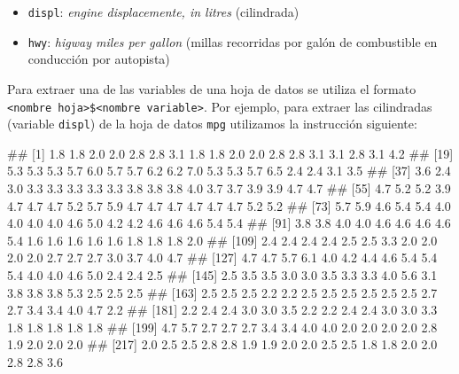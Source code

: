 \documentclass[
  title=normal,
  notoc,
  bib=normal]{mnye}
\newenvironment{Shaded}{\begin{snugshade}}{\end{snugshade}}
\newcommand{\NormalTok}[1]{#1}
\newcommand{\SpecialCharTok}[1]{\textcolor[rgb]{0.00,0.00,0.00}{#1}}
\providecommand{\tightlist}{%
  \setlength{\itemsep}{0pt}\setlength{\parskip}{0pt}}
\begin{document}
\begin{itemize}
\tightlist
\item
  \texttt{displ}: \emph{engine displacemente, in litres} (cilindrada)
\item
  \texttt{hwy}: \emph{higway miles per gallon} (millas recorridas por galón de combustible en conducción por autopista)
\end{itemize}

Para extraer una de las variables de una hoja de datos se utiliza el formato \texttt{\textless{}nombre\ hoja\textgreater{}\$\textless{}nombre\ variable\textgreater{}}. Por ejemplo, para extraer las cilindradas (variable \texttt{displ}) de la hoja de datos \texttt{mpg} utilizamos la instrucción siguiente:

\begin{Shaded}
\end{Shaded}

\begin{Shaded}
\begin{Highlighting}[]
\NormalTok{\#\#   [1] 1.8 1.8 2.0 2.0 2.8 2.8 3.1 1.8 1.8 2.0 2.0 2.8 2.8 3.1 3.1 2.8 3.1 4.2}
\NormalTok{\#\#  [19] 5.3 5.3 5.3 5.7 6.0 5.7 5.7 6.2 6.2 7.0 5.3 5.3 5.7 6.5 2.4 2.4 3.1 3.5}
\NormalTok{\#\#  [37] 3.6 2.4 3.0 3.3 3.3 3.3 3.3 3.3 3.8 3.8 3.8 4.0 3.7 3.7 3.9 3.9 4.7 4.7}
\NormalTok{\#\#  [55] 4.7 5.2 5.2 3.9 4.7 4.7 4.7 5.2 5.7 5.9 4.7 4.7 4.7 4.7 4.7 4.7 5.2 5.2}
\NormalTok{\#\#  [73] 5.7 5.9 4.6 5.4 5.4 4.0 4.0 4.0 4.0 4.6 5.0 4.2 4.2 4.6 4.6 4.6 5.4 5.4}
\NormalTok{\#\#  [91] 3.8 3.8 4.0 4.0 4.6 4.6 4.6 4.6 5.4 1.6 1.6 1.6 1.6 1.6 1.8 1.8 1.8 2.0}
\NormalTok{\#\# [109] 2.4 2.4 2.4 2.4 2.5 2.5 3.3 2.0 2.0 2.0 2.0 2.7 2.7 2.7 3.0 3.7 4.0 4.7}
\NormalTok{\#\# [127] 4.7 4.7 5.7 6.1 4.0 4.2 4.4 4.6 5.4 5.4 5.4 4.0 4.0 4.6 5.0 2.4 2.4 2.5}
\NormalTok{\#\# [145] 2.5 3.5 3.5 3.0 3.0 3.5 3.3 3.3 4.0 5.6 3.1 3.8 3.8 3.8 5.3 2.5 2.5 2.5}
\NormalTok{\#\# [163] 2.5 2.5 2.5 2.2 2.2 2.5 2.5 2.5 2.5 2.5 2.5 2.7 2.7 3.4 3.4 4.0 4.7 2.2}
\NormalTok{\#\# [181] 2.2 2.4 2.4 3.0 3.0 3.5 2.2 2.2 2.4 2.4 3.0 3.0 3.3 1.8 1.8 1.8 1.8 1.8}
\NormalTok{\#\# [199] 4.7 5.7 2.7 2.7 2.7 3.4 3.4 4.0 4.0 2.0 2.0 2.0 2.0 2.8 1.9 2.0 2.0 2.0}
\NormalTok{\#\# [217] 2.0 2.5 2.5 2.8 2.8 1.9 1.9 2.0 2.0 2.5 2.5 1.8 1.8 2.0 2.0 2.8 2.8 3.6}
\end{Highlighting}
\end{Shaded}
\end{document}
